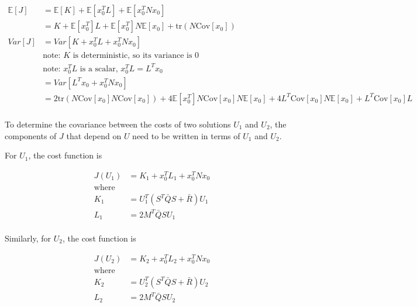 \documentclass{article}
\begin{document}
\begin{equation}
  \begin{aligned}
    \mathbb{E}[J] &= \mathbb{E}[K] + \mathbb{E}[x_0^T L] + \mathbb{E}[x_0^T N x_0] \\
    &= K + \mathbb{E}[x_0^T] L + \mathbb{E}[x_0^T] N \mathbb{E}[x_0] + \text{tr}(N \text{Cov}[x_0]) \\
    Var[J] &= Var[K + x_0^T L + x_0^T N x_0] \\
    &\text{note: $K$ is deterministic, so its variance is 0} \\
    & \text{note: $x_0^T L$ is a scalar, $x_0^T L = L^T x_0$} \\
    &= Var[L^T x_0 + x_0^T N x_0] \\
    &= 2\text{tr}(N \text{Cov}[x_0] N \text{Cov}[x_0]) + 4 \mathbb{E}[x_0^T]N\text{Cov}[x_0]N\mathbb{E}[x_0] + 4 L^T \text{Cov}[x_0] N \mathbb{E}[x_0] + L^T \text{Cov}[x_0] L \\
  \end{aligned}
\end{equation}

To determine the covariance between the costs of two solutions $U_1$ and $U_2$, the components of $J$ that depend on $U$
need to be written in terms of $U_1$ and $U_2$.

For $U_1$, the cost function is

$$
\begin{aligned}
  J(U_1) &= K_1 + x_0^T L_1 + x_0^T N x_0 \\
  \text{where} \\
  K_1 &= U_1^T(S^T \bar{Q} S + \bar{R}) U_1 \\
  L_1 &= 2 M^T \bar{Q} S U_1 \\
\end{aligned}
$$

Similarly, for $U_2$, the cost function is

$$
\begin{aligned}
  J(U_2) &= K_2 + x_0^T L_2 + x_0^T N x_0 \\
  \text{where} \\
  K_2 &= U_2^T(S^T \bar{Q} S + \bar{R}) U_2 \\
  L_2 &= 2 M^T \bar{Q} S U_2 \\
\end{aligned}
$$
\end{document}
